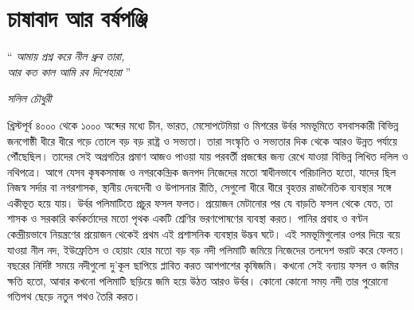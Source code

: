 
\chapter{চাষাবাদ আর বর্ষপঞ্জি}\label{ch:2}

\epigraph{``\textit{
আমায় প্রশ্ন করে নীল ধ্রুব তারা,\\
আর কত কাল আমি রব দিশেহারা
}''}{\textit{সলিল চৌধুরী}}

খ্রিস্টপূর্ব ৪০০০ থেকে ১০০০ অব্দের মধ্যে চীন, ভারত, মেসোপটেমিয়া ও মিশরের উর্বর সমভূমিতে বসবাসকারী বিভিন্ন জনগোষ্ঠী ধীরে ধীরে গড়ে তোলে বড় বড় রাষ্ট্র ও সভ্যতা।
তারা সংস্কৃতি ও সভ্যতার দিক থেকে আরও উন্নত পর্যায়ে পৌঁছেছিল। তাদের সেই অগ্রগতির প্রমাণ আজও পাওয়া যায় পরবর্তী প্রজন্মের জন্য রেখে যাওয়া বিভিন্ন লিখিত দলিল ও নথিপত্রে।
আগে যেসব কৃষকসমাজ ও নগরকেন্দ্রিক জনপদ নিজেদের মতো স্বাধীনভাবে পরিচালিত হতো, যাদের ছিল নিজস্ব সর্দার বা নগরশাসক, স্থানীয় দেবদেবী ও উপাসনার রীতি, সেগুলো ধীরে ধীরে বৃহত্তর রাজনৈতিক ব্যবস্থার সঙ্গে একীভূত হয়ে যায়।
উর্বর পলিমাটিতে প্রচুর ফসল ফলত। প্রয়োজন মেটানোর পর যে বাড়তি ফসল থেকে যেত, তা শাসক ও সরকারি কর্মকর্তাদের মতো পৃথক একটি শ্রেণির ভরণপোষণের ব্যবস্থা করত।
পানির প্রবাহ ও বণ্টন কেন্দ্রীয়ভাবে নিয়ন্ত্রণের প্রয়োজন থেকেই প্রথম এই প্রশাসনিক ব্যবস্থার উদ্ভব ঘটে।
এই সমভূমিগুলোর ওপর দিয়ে বয়ে যাওয়া নীল নদ, ইউফ্রেতিস ও হোয়াং হোর মতো বড় বড় নদী পলিমাটি জমিয়ে নিজেদের তলদেশ ভরাট করে ফেলত। বছরের নির্দিষ্ট সময়ে নদীগুলো দু'কূল ছাপিয়ে প্লাবিত করত আশপাশের কৃষিজমি। কখনো সেই বন্যায় ফসল ও জমির ক্ষতি হতো, আবার কখনো পলিমাটি ছড়িয়ে জমি হয়ে উঠত আরও উর্বর। কোনো কোনো সময় নদী তার পুরোনো গতিপথ ছেড়ে নতুন পথও তৈরি করত।
